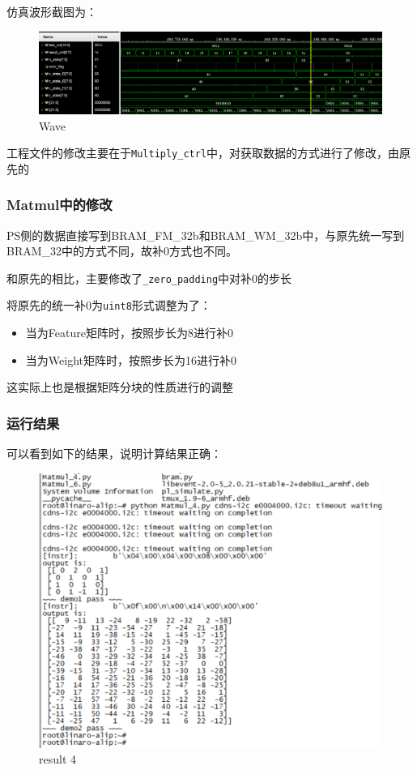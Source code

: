 \documentclass[12pt,a4paper]{article}
\begin{document}
仿真波形截图为：

\begin{figure}[htbp]
    \centering
    \includegraphics[width=\linewidth]{img/wave.png}
    \caption{Wave}
\end{figure}

工程文件的修改主要在于\texttt{Multiply\_ctrl}中，对获取数据的方式进行了修改，由原先的

\subsubsection{Matmul中的修改}

PS侧的数据直接写到BRAM\_FM\_32b和BRAM\_WM\_32b中，与原先统一写到BRAM\_32中的方式不同，故补0方式也不同。

和原先的相比，主要修改了\texttt{\_zero\_padding}中对补0的步长

将原先的统一补0为\texttt{uint8}形式调整为了：

\begin{itemize}
\item
  当为Feature矩阵时，按照步长为8进行补0
\item
  当为Weight矩阵时，按照步长为16进行补0
\end{itemize}

这实际上也是根据矩阵分块的性质进行的调整

\subsubsection{运行结果}

可以看到如下的结果，说明计算结果正确：

\begin{figure}[htbp]
    \centering
    \includegraphics[width=0.6\linewidth]{img/result_4.png}
    \caption{result 4}
\end{figure}
\end{document}

